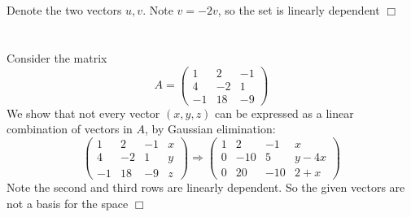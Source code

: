 \documentclass{article}
\begin{document}
\section{}
Denote the two vectors $u,v$. Note $v = -2v$, so the set is linearly dependent $\Box$

\section{}
Consider the matrix
$$ A= \left(\begin{matrix}1&2&-1\\4&-2&1\\-1&18&-9\end{matrix}\right) $$
We show that not every vector $(x,y,z)$ can be expressed as a linear combination of vectors in $A$, by Gaussian elimination:
$$ \left(\begin{matrix}1&2&-1&x\\4&-2&1&y\\-1&18&-9&z\end{matrix}\right) \Rightarrow \left(\begin{matrix}1&2&-1&x\\0&-10&5&y-4x\\0&20&-10&2+x\end{matrix}\right)$$
Note the second and third rows are linearly dependent. So the given vectors are not a basis for the space $\Box$
\end{document}
